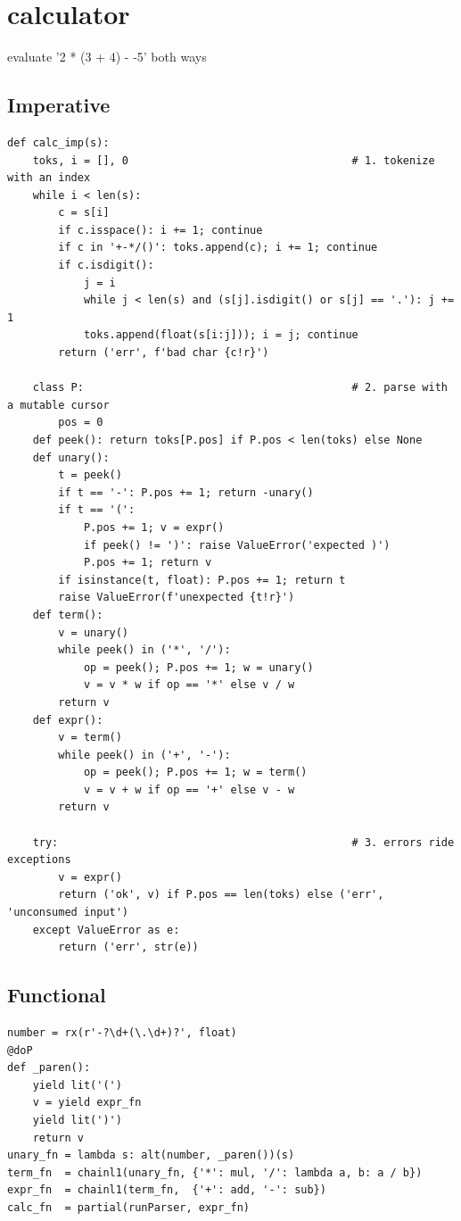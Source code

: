 \documentclass[10pt,letterpaper]{book}
\begin{document}
\chapter{calculator}
evaluate '2 * (3 + 4) - -5' both ways

\section*{Imperative}
\begin{lstlisting}[style=code]
def calc_imp(s):
    toks, i = [], 0                                   # 1. tokenize with an index
    while i < len(s):
        c = s[i]
        if c.isspace(): i += 1; continue
        if c in '+-*/()': toks.append(c); i += 1; continue
        if c.isdigit():
            j = i
            while j < len(s) and (s[j].isdigit() or s[j] == '.'): j += 1
            toks.append(float(s[i:j])); i = j; continue
        return ('err', f'bad char {c!r}')

    class P:                                          # 2. parse with a mutable cursor
        pos = 0
    def peek(): return toks[P.pos] if P.pos < len(toks) else None
    def unary():
        t = peek()
        if t == '-': P.pos += 1; return -unary()
        if t == '(':
            P.pos += 1; v = expr()
            if peek() != ')': raise ValueError('expected )')
            P.pos += 1; return v
        if isinstance(t, float): P.pos += 1; return t
        raise ValueError(f'unexpected {t!r}')
    def term():
        v = unary()
        while peek() in ('*', '/'):
            op = peek(); P.pos += 1; w = unary()
            v = v * w if op == '*' else v / w
        return v
    def expr():
        v = term()
        while peek() in ('+', '-'):
            op = peek(); P.pos += 1; w = term()
            v = v + w if op == '+' else v - w
        return v

    try:                                              # 3. errors ride exceptions
        v = expr()
        return ('ok', v) if P.pos == len(toks) else ('err', 'unconsumed input')
    except ValueError as e:
        return ('err', str(e))
\end{lstlisting}
\section*{Functional}
\begin{lstlisting}[style=code]
number = rx(r'-?\d+(\.\d+)?', float)
@doP
def _paren():
    yield lit('(')
    v = yield expr_fn
    yield lit(')')
    return v
unary_fn = lambda s: alt(number, _paren())(s)
term_fn  = chainl1(unary_fn, {'*': mul, '/': lambda a, b: a / b})
expr_fn  = chainl1(term_fn,  {'+': add, '-': sub})
calc_fn  = partial(runParser, expr_fn)
\end{lstlisting}
\end{document}
